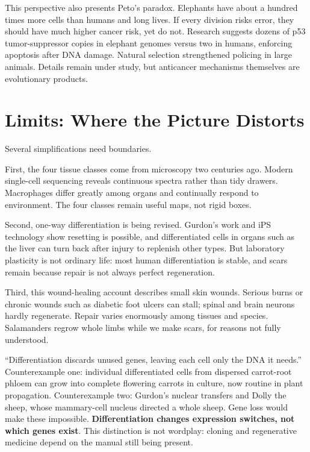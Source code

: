 This perspective also presents Peto's paradox. Elephants have about a hundred times more cells than humans and long lives. If every division risks error, they should have much higher cancer risk, yet do not. Research suggests dozens of p53 tumor-suppressor copies in elephant genomes versus two in humans, enforcing apoptosis after DNA damage. Natural selection strengthened policing in large animals. Details remain under study, but anticancer mechanisms themselves are evolutionary products.

\section{Limits: Where the Picture Distorts}

Several simplifications need boundaries.

First, the four tissue classes come from microscopy two centuries ago. Modern single-cell sequencing reveals continuous spectra rather than tidy drawers. Macrophages differ greatly among organs and continually respond to environment. The four classes remain useful maps, not rigid boxes.

Second, one-way differentiation is being revised. Gurdon's work and iPS technology show resetting is possible, and differentiated cells in organs such as the liver can turn back after injury to replenish other types. But laboratory plasticity is not ordinary life: most human differentiation is stable, and scars remain because repair is not always perfect regeneration.

Third, this wound-healing account describes small skin wounds. Serious burns or chronic wounds such as diabetic foot ulcers can stall; spinal and brain neurons hardly regenerate. Repair varies enormously among tissues and species. Salamanders regrow whole limbs while we make scars, for reasons not fully understood.

\begin{wuqu}
``Differentiation discards unused genes, leaving each cell only the DNA it needs.'' Counterexample one: individual differentiated cells from dispersed carrot-root phloem can grow into complete flowering carrots in culture, now routine in plant propagation. Counterexample two: Gurdon's nuclear transfers and Dolly the sheep, whose mammary-cell nucleus directed a whole sheep. Gene loss would make these impossible. \textbf{Differentiation changes expression switches, not which genes exist}. This distinction is not wordplay: cloning and regenerative medicine depend on the manual still being present.
\end{wuqu}

